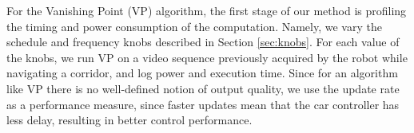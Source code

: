 For the Vanishing Point (VP) algorithm, the first stage of our method is profiling the timing and power consumption of the computation.
Namely, we vary the schedule and frequency knobs described in Section \ref{sec:knobs}.
For each value of the knobs, we run VP on a video sequence previously acquired by the robot while navigating a corridor, and log power and execution time.
Since for an algorithm like VP there is no well-defined notion of output quality, we use the update rate as a performance measure, since faster updates mean that the car controller has less delay, resulting in better control performance. 


